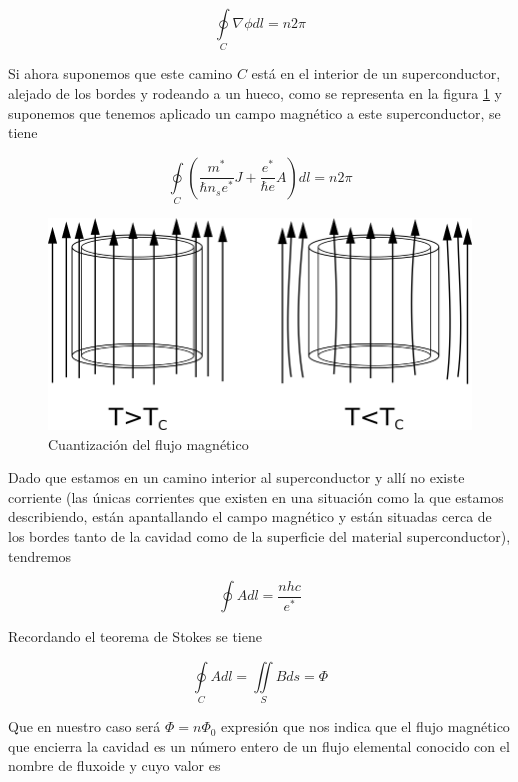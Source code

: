 \begin{equation}
    \oint\limits_C \nabla \phi dl = n 2 \pi
\end{equation}

Si ahora suponemos que este camino $C$ está en el interior de un superconductor, alejado de los bordes y rodeando a un hueco, como se representa en la figura \ref{fig:fluxquant} y suponemos que tenemos aplicado un campo magnético a este superconductor, se tiene

\begin{equation}
    \oint\limits_C (\frac{m^*}{\hbar n_s e^*} J + \frac{e^*}{\hbar e} A) dl = n 2 \pi
\end{equation}

\begin{figure}[H]
\centering \includegraphics[width=0.8\linewidth]{img/fluxquant.png}
\caption{Cuantización del flujo magnético}
\label{fig:fluxquant}
\end{figure}

Dado que estamos en un camino interior al superconductor y allí no existe corriente (las únicas corrientes que existen en una situación como la que estamos describiendo, están apantallando el campo magnético y están situadas cerca de los bordes tanto de la cavidad como de la superficie del material superconductor), tendremos

\begin{equation}
    \oint A dl = \frac{n h c}{e^*}
\end{equation}

Recordando el teorema de Stokes se tiene

\begin{equation}
    \oint\limits_C A dl = \iint\limits_S B ds = \Phi
\end{equation}

Que en nuestro caso será $\Phi = n \Phi_0$ expresión que nos indica que el flujo magnético que encierra la cavidad es un número entero de un flujo elemental conocido con el nombre de fluxoide y cuyo valor es

